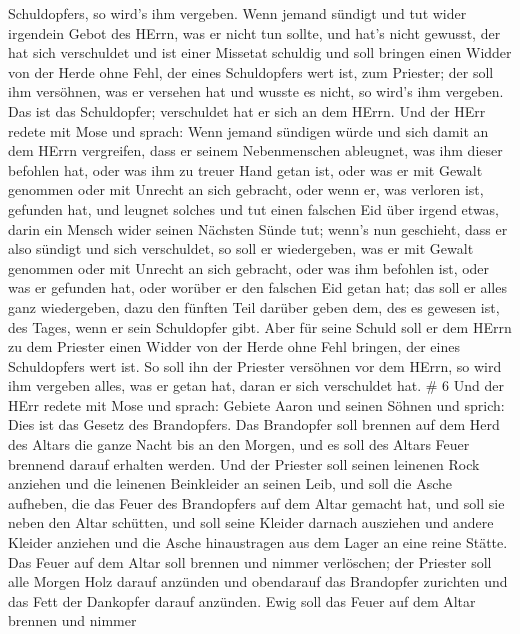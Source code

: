 Schuldopfers, so wird's ihm vergeben.  Wenn jemand sündigt
und tut wider irgendein Gebot des HErrn, was er nicht tun sollte, und
hat's nicht gewusst, der hat sich verschuldet und ist einer Missetat
schuldig  und soll bringen einen Widder von der Herde ohne
Fehl, der eines Schuldopfers wert ist, zum Priester; der soll ihm
versöhnen, was er versehen hat und wusste es nicht, so wird's ihm
vergeben.  Das ist das Schuldopfer; verschuldet hat er sich
an dem HErrn.  Und der HErr redete mit Mose und sprach:
 Wenn jemand sündigen würde und sich damit an dem HErrn
vergreifen, dass er seinem Nebenmenschen ableugnet, was ihm dieser
befohlen hat, oder was ihm zu treuer Hand getan ist, oder was er mit
Gewalt genommen oder mit Unrecht an sich gebracht,  oder
wenn er, was verloren ist, gefunden hat, und leugnet solches und tut
einen falschen Eid über irgend etwas, darin ein Mensch wider seinen
Nächsten Sünde tut;  wenn's nun geschieht, dass er also
sündigt und sich verschuldet, so soll er wiedergeben, was er mit Gewalt
genommen oder mit Unrecht an sich gebracht, oder was ihm befohlen ist,
oder was er gefunden hat,  oder worüber er den falschen Eid
getan hat; das soll er alles ganz wiedergeben, dazu den fünften Teil
darüber geben dem, des es gewesen ist, des Tages, wenn er sein
Schuldopfer gibt.  Aber für seine Schuld soll er dem HErrn
zu dem Priester einen Widder von der Herde ohne Fehl bringen, der eines
Schuldopfers wert ist.  So soll ihn der Priester versöhnen
vor dem HErrn, so wird ihm vergeben alles, was er getan hat, daran er
sich verschuldet hat. \# 6  Und der HErr redete mit Mose und
sprach:  Gebiete Aaron und seinen Söhnen und sprich: Dies
ist das Gesetz des Brandopfers. Das Brandopfer soll brennen auf dem Herd
des Altars die ganze Nacht bis an den Morgen, und es soll des Altars
Feuer brennend darauf erhalten werden.  Und der Priester
soll seinen leinenen Rock anziehen und die leinenen Beinkleider an
seinen Leib, und soll die Asche aufheben, die das Feuer des Brandopfers
auf dem Altar gemacht hat, und soll sie neben den Altar schütten,
 und soll seine Kleider darnach ausziehen und andere Kleider
anziehen und die Asche hinaustragen aus dem Lager an eine reine Stätte.
 Das Feuer auf dem Altar soll brennen und nimmer verlöschen;
der Priester soll alle Morgen Holz darauf anzünden und obendarauf das
Brandopfer zurichten und das Fett der Dankopfer darauf anzünden.
 Ewig soll das Feuer auf dem Altar brennen und nimmer
